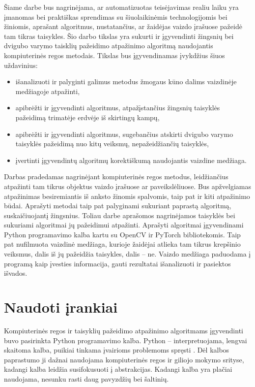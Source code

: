 \documentclass{VUMIFPSbakalaurinis}
\begin{document}
Šiame darbe bus nagrinėjama, ar automatizuotas teisėjavimas realiu laiku yra įmanomas bei praktiškas sprendimas su šiuolaikinėmis technologijomis bei žiniomis, aprašant algoritmus, nustatančius, ar žaidėjas vaizdo įrašuose pažeidė tam tikras taisykles. Šio darbo tikslas yra sukurti ir įgyvendinti žingsnių bei dvigubo varymo taisklių pažeidimo atpažinimo algoritmą naudojantis kompiuterinės regos metodais. Tikslas bus įgyvendinamas įvykdžius šiuos uždavinius:

\begin{itemize}
	\item išanalizuoti ir palyginti galimus metodus žmogaus kūno dalims vaizdinėje medžiagoje atpažinti,
	\item apibrėžti ir įgyvendinti algoritmus, atpažįstančius žingsnių taisyklės pažeidimą
	trimatėje erdvėje iš skirtingų kampų,
	\item apibrėžti ir įgyvendinti algoritmus, sugebančius atskirti dvigubo varymo
	taisyklės pažeidimą nuo kitų veiksmų, nepažeidžiančių taisyklės,
	\item įvertinti įgyvendintų algoritmų korektiškumą naudojantis vaizdine medžiaga.
\end{itemize}

Darbas pradedamas nagrinėjant kompiuterinės regos metodus, leidžiančius atpažinti tam tikrus objektus vaizdo įrašuose ar paveikslėliuose. Bus apžvelgiamas atpažinimas besiremiantis iš anksto žinomis spalvomis, taip pat ir kiti atpažinimo būdai. Aprašyti metodai taip pat palyginami sukuriant paprastą algoritmą, suskaičiuojantį žingsnius. Toliau darbe aprašomos nagrinėjamos taisyklės bei sukuriami algoritmai jų pažeidimui atpažinti. Aprašyti algoritmai įgyvendinami Python programavimo kalba kartu su OpenCV ir PyTorch bibliotekomis. Taip pat nufilmuota vaizdinė medžiaga, kurioje žaidėjai atlieka tam tikrus krepšinio veiksmus, dalis iš jų pažeidžia taisykles, dalis – ne. Vaizdo medžiaga paduodama į programą kaip įvesties informacija, gauti rezultatai išanalizuoti ir pasiektos išvados.


\section{Naudoti įrankiai}

Kompiuterinės regos ir taisyklių pažeidimo atpažinimo algoritmams įgyvendinti buvo pasirinkta Python programavimo kalba. Python – interpretuojama, lengvai skaitoma kalba, puikiai tinkama įvairioms problemoms spręsti \cite{Python}. Dėl kalbos paprastumo ji dažnai naudojama kompiuterinės regos ir giliojo mokymo srityse, kadangi kalba leidžia susifokusuoti į abstrakcijas. Kadangi kalba yra plačiai naudojama, nesunku rasti daug pavyzdžių bei šaltinių. 
\end{document}
